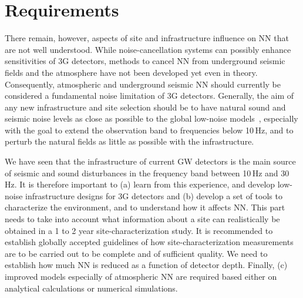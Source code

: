 \section{Requirements}
There remain, however, aspects of site and infrastructure influence on NN that are not well understood. 
While noise-cancellation systems can possibly enhance sensitivities of 3G detectors, methods to cancel NN from underground seismic fields and the atmosphere have not been developed yet even in theory. Consequently, atmospheric and underground seismic NN should currently be considered a fundamental noise limitation of 3G detectors. Generally, the aim of any new infrastructure and site selection should be to have natural sound and seismic noise levels as close as possible to the global low-noise models~\cite{Pet1993}, especially with the goal to extend the observation band to frequencies below 10\,Hz, and to perturb the natural fields as little as possible with the infrastructure. 

We have seen that the infrastructure of current GW detectors is the main source of seismic and sound disturbances in the frequency band between 10\,Hz and 30\,Hz. It is therefore important to (a) learn from this experience, and develop low-noise infrastructure designs for 3G detectors %
and (b) 
develop a set of tools to characterize the environment, and to understand how it affects NN. This part needs to take into account what information about a site can realistically be obtained in a 1 to 2 year site-characterization study. It is recommended to establish globally accepted guidelines of how site-characterization measurements are to be carried out to be complete and of sufficient quality. We need to establish how much NN is reduced as a function of detector depth. Finally, (c) improved models especially of atmospheric NN are required based either on analytical calculations or numerical simulations.

